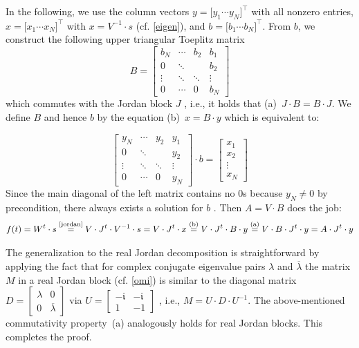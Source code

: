 \documentclass{sn-jnl}
\theoremstyle{definition}
\begin{document}
{In the following, we use the column vectors $y = \big[ y_1 \cdots y_N
\big]^\top$ with all nonzero entries, $x = \big[ x_1 \cdots x_N \big]^\top$
with $x = V^{-1} \cdot s$ (cf. \cref{eigen}), and $b = \big[ b_1 \cdots b_N
\big]^\top$. From $b$, we construct the following upper triangular Toeplitz
matrix
\[ B = \left[ \begin{array}{*{4}{c}}
  b_N & \cdots & b_2 & b_1\\
  0 & \ddots & & b_2\\
  \vdots & \ddots & \ddots & \vdots\\
  0 & \cdots & 0 & b_N
\end{array} \right] \]
which commutes with the Jordan block $J$ \citep[Section~3.2.4]{HJ13}, i.e., it
holds that (a)~$J \cdot B = B \cdot J$. We define $B$ and hence $b$ by the
equation (b)~$x = B \cdot y$ which is equivalent to:

\[ \left[ \begin{array}{*{4}{c}}
  y_N & \cdots & y_2 & y_1\\
  0 & \ddots & & y_2\\
  \vdots & \ddots & \ddots & \vdots\\
  0 & \cdots & 0 & y_N
\end{array} \right] \cdot b = \left[ \begin{array}{c}
  x_1\\[7pt] x_2\\ \vdots\\ x_N
\end{array} \right] \]
Since the main diagonal of the left matrix contains no $0$s because $y_N \neq 0$
by precondition, there always exists a solution for $b$ \citep[Section~0.9.3]{HJ13}.
Then $A = V \cdot B$ does the job:
\[ f(t) = W^t \cdot s
	\overset{\text{\cref{jordan}}}{=} V \cdot J^t \cdot V^{-1} \cdot s
	= V \cdot J^t \cdot x
	\overset{\text{(b)}}{=} V \cdot J^t \cdot B \cdot y
	\overset{\text{(a)}}{=} V \cdot B \cdot J^t \cdot y
	= A \cdot J^t \cdot y
\]

The generalization to the real Jordan decomposition is straightforward by
applying the fact that for complex conjugate eigenvalue pairs $\lambda$ and
$\overline{\lambda}$ the matrix $M$ in a real Jordan block (cf. \cref{omi}) is
similar to the diagonal matrix $D = \left[ \begin{array}{cc}
	\lambda & 0\\
	0 & \overline{\lambda}
\end{array} \right]$ via $U = \left[ \begin{array}{cc}
	-\mathfrak{i} & -\mathfrak{i}\\
	1 & -1
\end{array} \right]$ \citep[Section~3.4.1]{HJ13}, i.e., $M = U \cdot D \cdot
U^{-1}$. The above-mentioned commutativity property~(a) analogously holds for real
Jordan blocks. This completes the proof.

}
\end{document}
